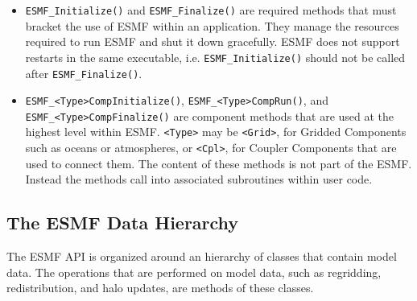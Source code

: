 \begin{itemize}

\item {\tt ESMF\_Initialize()} and {\tt ESMF\_Finalize()} are required 
methods that must bracket the use of ESMF within an application.  
They manage the resources required to run ESMF and shut it down
gracefully.  ESMF does not support restarts in the same executable, i.e.
{\tt ESMF\_Initialize()} should not be called after {\tt ESMF\_Finalize()}.
\item {\tt ESMF\_<Type>CompInitialize()}, {\tt ESMF\_<Type>CompRun()}, and {\tt ESMF\_<Type>CompFinalize()} are component methods that are used at the 
highest level within ESMF.  {\tt <Type>} may be {\tt <Grid>}, for 
Gridded Components such as oceans or atmospheres, or
{\tt <Cpl>}, for Coupler Components that are used to connect 
them.  The content of these methods is not part of the ESMF.  
Instead the methods call into associated subroutines within 
user code.

\end{itemize}

\subsection{The ESMF Data Hierarchy}

The ESMF API is organized around an hierarchy of classes that 
contain model data.  The operations that are performed
on model data, such as regridding, redistribution, and halo 
updates, are methods of these classes.  

